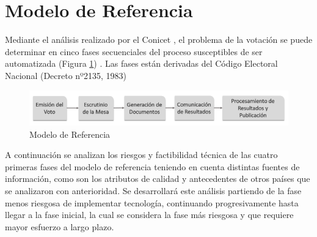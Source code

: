 \section{Modelo de Referencia}
Mediante el análisis realizado por el Conicet \cite{conicet}, el problema de la votación se puede determinar en cinco fases secuenciales del proceso susceptibles de ser automatizada (Figura \ref{graf:modeloReferencia}) . Las fases están derivadas del Código Electoral Nacional (Decreto nº2135, 1983) \cite{decreto}

\begin{figure}[h!]
    \begin{center}
        \includegraphics[width=\textwidth]{img/modeloReferencia.png}
    \end{center}
  \caption{Modelo de Referencia}
  \label{graf:modeloReferencia}
\end{figure}

A continuación se analizan los riesgos y factibilidad técnica de las cuatro primeras fases del modelo de referencia teniendo en cuenta distintas fuentes de información, como son los atributos de calidad y antecedentes de otros países que se analizaron con anterioridad. Se desarrollará este análisis partiendo de la fase menos riesgosa de implementar tecnología, continuando progresivamente hasta llegar a la fase inicial, la cual se considera la fase más riesgosa y que requiere mayor esfuerzo a largo plazo.


